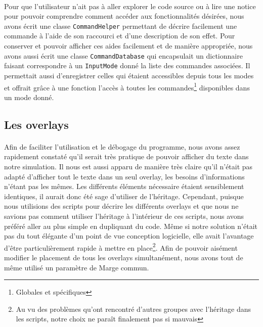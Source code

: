 \paragraph{}
Pour que l'utilisateur n'ait pas à aller explorer le code source ou à lire une
notice pour pouvoir comprendre comment accéder aux fonctionnalités désirées,
nous avons écrit une classe \verb!CommandHelper! permettant de décrire
facilement une commande à l'aide de son raccourci et d'une description de son
effet. Pour conserver et pouvoir afficher ces aides facilement et de manière
appropriée, nous avons aussi écrit une classe \verb!CommandDatabase! qui
encapsulait un dictionnaire faisant correspondre à un \verb!InputMode! donné
la liste des commandes associées. Il permettait aussi d'enregistrer celles qui
étaient accessibles depuis tous les modes et offrait grâce à une fonction
l'accès à toutes les commandes\footnote{Globales et spécifiques} disponibles
dans un mode donné.

\subsection{Les overlays}
\paragraph{}
Afin de faciliter l'utilisation et le débogage du programme, nous avons assez
rapidement constaté qu'il serait très pratique de pouvoir afficher du texte
dans notre simulation. Il nous est aussi apparu de manière très claire qu'il
n'était pas adapté d'afficher tout le texte dans un seul overlay, les besoins
d'informations n'étant pas les mêmes. Les différents éléments nécessaire
étaient sensiblement identiques, il aurait donc été sage d'utiliser de
l'héritage. Cependant, puisque nous utilisions des scripts pour décrire les
différents overlays et que nous ne savions pas comment utiliser l'héritage à
l'intérieur de ces scripts, nous avons préféré aller au plus simple en
dupliquant du code. Même si notre solution n'était pas du tout élégante d'un
point de vue conception logicielle, elle avait l'avantage d'être
particulièrement rapide à mettre en place\footnote{Au vu des problèmes qu'ont
rencontré d'autres groupes avec l'héritage dans les scripts, notre choix ne
paraît finalement pas si mauvais}. Afin de pouvoir aisément modifier le
placement de tous les overlays simultanément, nous avons tout de même utilisé
un paramètre de Marge commun.

